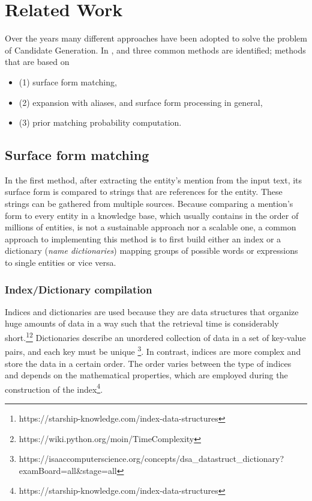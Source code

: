 \chapter{Related Work}
\label{related Work}

Over the years many different approaches have been adopted to solve the problem of Candidate Generation. In \cite{Sevgili2020}, \cite{8999622} and \cite{Shen2015} three common methods are identified; methods that are based on
\begin{itemize}
\item{(1) surface form matching,}
\item{(2) expansion with aliases, and surface form processing in general,}
\item{(3) prior matching probability computation.}\newline
\end{itemize}

\section{Surface form matching}
In the first method, after extracting the entity's mention from the input text, its surface form is compared to strings that are references for the entity. These strings can be gathered from multiple sources. Because comparing a mention's form to every entity in a knowledge base, which usually contains in the order of millions of entities, is not a sustainable approach nor a scalable one, a common approach to implementing this method is to first build either an index or a dictionary (\textit{name dictionaries}) mapping groups of possible words or expressions to single entities or vice versa.\newline

\subsection{Index/Dictionary compilation}
\label{dictsubsection}
Indices and dictionaries are used because they are data structures that organize huge amounts of data in a way such that the retrieval time is considerably short.\footnote{https://starship-knowledge.com/index-data-structures}\footnote{https://wiki.python.org/moin/TimeComplexity}\newline
Dictionaries describe an unordered collection of data in a set of key-value pairs, and each key must be unique \footnote{https://isaaccomputerscience.org/concepts/dsa\_datastruct\_dictionary?examBoard=all\&stage=all}. In contrast, indices are more complex and store the data in a certain order. The order varies between the type of indices and depends on the mathematical properties, which are employed during the construction of the index\footnote{https://starship-knowledge.com/index-data-structures}.\newline

